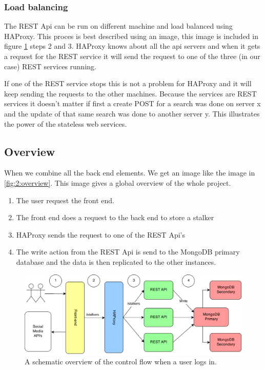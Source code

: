 \subsubsection{Load balancing}
\label{sssec:2:loadbalancing}
The REST Api can be run on different machine and load balanced using HAProxy. This proces is best described using an image, this image is included in figure \ref{fig:2:overview} steps 2 and 3. HAProxy knows about all the api servers and when it gets a request for the REST service it will send the request to one of the three (in our case) REST services running.

If one of the REST service stops this is not a problem for HAProxy and it will keep sending the requests to the other machines. Because the services are REST services it doesn't matter if first a create POST for a search was done on server x and the update of that same search was done to another server y. This illustrates the power of the stateless web services.

\pagebreak

\subsection{Overview}
When we combine all the back end elements. We get an image like the image in \autoref{fig:2:overview}. This image gives a global overview of the whole project.

\begin{enumerate}
\item The user request the front end.
\item The front end does a request to the back end to store a stalker
\item HAProxy sends the request to one of the REST Api's
\item The write action from the REST Api is send to the MongoDB primary database and the data is then replicated to the other instances. 
\end{enumerate}

\begin{figure}
\includegraphics[width=\textwidth]{./img/overview} 
\caption{A schematic overview of the control flow when a user logs in.}
\label{fig:2:overview}
\end{figure}
